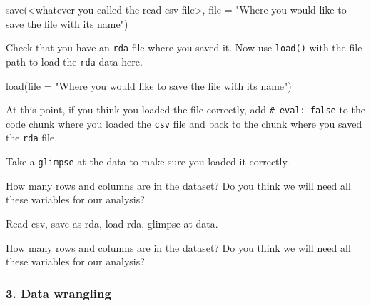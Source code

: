 \documentclass[
  letterpaper,
  DIV=11,
  numbers=noendperiod]{scrartcl}
\newenvironment{Shaded}{\begin{snugshade}}{\end{snugshade}}
\newcommand{\AttributeTok}[1]{\textcolor[rgb]{0.40,0.45,0.13}{#1}}
\newcommand{\FunctionTok}[1]{\textcolor[rgb]{0.28,0.35,0.67}{#1}}
\newcommand{\NormalTok}[1]{\textcolor[rgb]{0.00,0.23,0.31}{#1}}
\newcommand{\SpecialCharTok}[1]{\textcolor[rgb]{0.37,0.37,0.37}{#1}}
\newcommand{\StringTok}[1]{\textcolor[rgb]{0.13,0.47,0.30}{#1}}
\begin{document}
\begin{Shaded}
\begin{Highlighting}[]
\FunctionTok{save}\NormalTok{(}\SpecialCharTok{\textless{}}\NormalTok{whatever you called the read csv file}\SpecialCharTok{\textgreater{}}\NormalTok{, }\AttributeTok{file =} \StringTok{"Where you would like to save the file with its name"}\NormalTok{)}
\end{Highlighting}
\end{Shaded}

Check that you have an \texttt{rda} file where you saved it. Now use
\texttt{load()} with the file path to load the \texttt{rda} data here.

\begin{Shaded}
\begin{Highlighting}[]
\FunctionTok{load}\NormalTok{(}\AttributeTok{file =} \StringTok{"Where you would like to save the file with its name"}\NormalTok{)}
\end{Highlighting}
\end{Shaded}

At this point, if you think you loaded the file correctly, add
\texttt{\#\textbar{}\ eval:\ false} to the code chunk where you loaded
the \texttt{csv} file and back to the chunk where you saved the
\texttt{rda} file.

Take a \texttt{glimpse} at the data to make sure you loaded it
correctly.

How many rows and columns are in the dataset? Do you think we will need
all these variables for our analysis?

\begin{tcolorbox}[enhanced jigsaw, coltitle=black, bottomrule=.15mm, opacityback=0, arc=.35mm, toprule=.15mm, colbacktitle=quarto-callout-important-color!10!white, left=2mm, colback=white, opacitybacktitle=0.6, colframe=quarto-callout-important-color-frame, rightrule=.15mm, leftrule=.75mm, breakable, bottomtitle=1mm, titlerule=0mm, toptitle=1mm, title=\textcolor{quarto-callout-important-color}{\faExclamation}\hspace{0.5em}{Task Summary}]

Read csv, save as rda, load rda, glimpse at data.

How many rows and columns are in the dataset? Do you think we will need
all these variables for our analysis?

\end{tcolorbox}

\hypertarget{data-wrangling}{%
\subsubsection{3. Data wrangling}\label{data-wrangling}}
\end{document}
